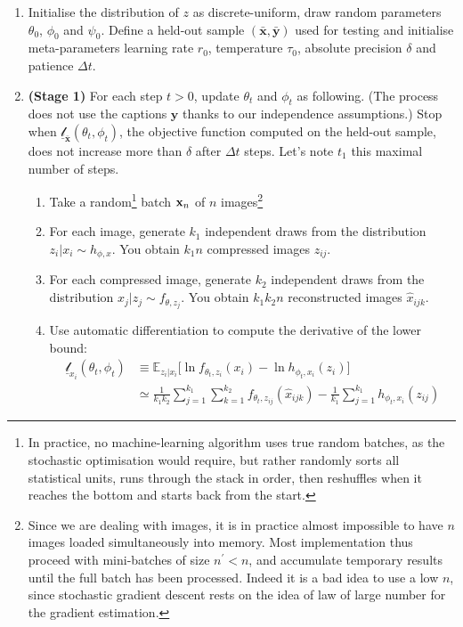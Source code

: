\documentclass{article}
\begin{document}
\begin{appendix}
\begin{multicols}{2}
\begin{enumerate}
    \item Initialise the distribution of $z$ as discrete-uniform, draw random parameters $\theta_0$,  $\phi_0$ and $\psi_0$. Define a held-out sample $(\bar{\mathbf{x}},\bar{\mathbf{y}})$ used for testing and initialise meta-parameters learning rate $r_0$, temperature $\tau_0$, absolute precision $\delta$ and patience $\Delta t$.
    \item \textbf{(Stage 1)} For each step $t>0$, update $\theta_t$ and $\phi_t$ as following. (The process does not use the captions $\mathbf{y}$ thanks to our independence assumptions.) Stop when $\underline{\mathscr{l}}_{\bar{\mathbf{x}}}(\theta_t,\phi_t)$, the objective function computed on the held-out sample, does not increase more than $\delta$ after $\Delta t$ steps. Let's note $t_1$ this maximal number of steps.
    \begin{enumerate}
    \item Take a random\footnote{In practice, no machine-learning algorithm uses true random batches, as the stochastic optimisation would require, but rather randomly sorts all statistical units, runs through the stack in order, then reshuffles when it reaches the bottom and starts back from the start.} batch $\mathbf{x}_n$ of $n$ images\footnote{Since we are dealing with images, it is in practice almost impossible to have $n$ images loaded simultaneously into memory. Most implementation thus proceed with mini-batches of size $n^\prime<n$, and accumulate temporary results until the full batch has been processed. Indeed it is a bad idea to use a low $n$, since stochastic gradient descent rests on the idea of law of large number for the gradient estimation.}
    \item For each image, generate $k_1$ independent draws from the distribution $z_i|x_i\sim h_{\phi,x}$. You obtain $k_1n$ compressed images $z_{ij}$.
    \item For each compressed image, generate $k_2$ independent draws from the distribution $x_j|z_j\sim f_{\theta,z_j}$. You obtain $k_1k_2n$ reconstructed images $\hat x_{ijk}$.
    \item Use automatic differentiation to compute the derivative of the lower bound: \begin{align*}
    \underline{\mathscr{l}}_{x_i}(\theta_{t},\phi_{t}) & \equiv \mathbb{E}_{z_i|x_i} \Big[\ln f_{\theta_t,z_i}(x_i) -\ln h_{\phi_t,x_i}(z_i)\Big] \\ & \simeq \frac{1}{k_1k_2}\sum_{j=1}^{k_1}\sum_{k=1}^{k_2} f_{ \theta_t,z_{ij}}( \hat{x}_{ijk} )-\frac{1}{k_1}\sum_{j=1}^{k_1} h_{\phi_t,x_i}(z_{ij})

\end{align*}
\end{enumerate}
\end{enumerate}
\end{multicols}
\end{appendix}
\end{document}
